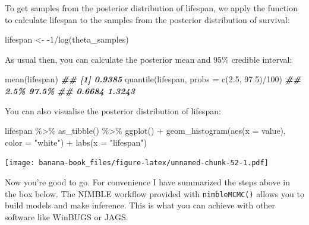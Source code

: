 \documentclass[
  12pt,
]{krantz}
\newenvironment{Shaded}{\begin{snugshade}}{\end{snugshade}}
\newcommand{\AttributeTok}[1]{\textcolor[rgb]{0.77,0.63,0.00}{#1}}
\newcommand{\DecValTok}[1]{\textcolor[rgb]{0.00,0.00,0.81}{#1}}
\newcommand{\DocumentationTok}[1]{\textcolor[rgb]{0.56,0.35,0.01}{\textbf{\textit{#1}}}}
\newcommand{\FloatTok}[1]{\textcolor[rgb]{0.00,0.00,0.81}{#1}}
\newcommand{\FunctionTok}[1]{\textcolor[rgb]{0.00,0.00,0.00}{#1}}
\newcommand{\NormalTok}[1]{#1}
\newcommand{\OtherTok}[1]{\textcolor[rgb]{0.56,0.35,0.01}{#1}}
\newcommand{\SpecialCharTok}[1]{\textcolor[rgb]{0.00,0.00,0.00}{#1}}
\newcommand{\StringTok}[1]{\textcolor[rgb]{0.31,0.60,0.02}{#1}}
\begin{document}
To get samples from the posterior distribution of lifespan, we apply the function to calculate lifespan to the samples from the posterior distribution of survival:

\begin{Shaded}
\begin{Highlighting}[]
\NormalTok{lifespan }\OtherTok{\textless{}{-}} \SpecialCharTok{{-}}\DecValTok{1}\SpecialCharTok{/}\FunctionTok{log}\NormalTok{(theta\_samples)}
\end{Highlighting}
\end{Shaded}

As usual then, you can calculate the posterior mean and 95\% credible interval:

\begin{Shaded}
\begin{Highlighting}[]
\FunctionTok{mean}\NormalTok{(lifespan)}
\DocumentationTok{\#\# [1] 0.9385}
\FunctionTok{quantile}\NormalTok{(lifespan, }\AttributeTok{probs =} \FunctionTok{c}\NormalTok{(}\FloatTok{2.5}\NormalTok{, }\FloatTok{97.5}\NormalTok{)}\SpecialCharTok{/}\DecValTok{100}\NormalTok{)}
\DocumentationTok{\#\#   2.5\%  97.5\% }
\DocumentationTok{\#\# 0.6684 1.3243}
\end{Highlighting}
\end{Shaded}

You can also visualise the posterior distribution of lifespan:

\begin{Shaded}
\begin{Highlighting}[]
\NormalTok{lifespan }\SpecialCharTok{\%\textgreater{}\%}
  \FunctionTok{as\_tibble}\NormalTok{() }\SpecialCharTok{\%\textgreater{}\%}
  \FunctionTok{ggplot}\NormalTok{() }\SpecialCharTok{+}
  \FunctionTok{geom\_histogram}\NormalTok{(}\FunctionTok{aes}\NormalTok{(}\AttributeTok{x =}\NormalTok{ value), }\AttributeTok{color =} \StringTok{"white"}\NormalTok{) }\SpecialCharTok{+}
  \FunctionTok{labs}\NormalTok{(}\AttributeTok{x =} \StringTok{"lifespan"}\NormalTok{)}
\end{Highlighting}
\end{Shaded}

\texttt{[image: banana-book\_files/figure-latex/unnamed-chunk-52-1.pdf]}

Now you're good to go. For convenience I have summarized the steps above in the box below. The NIMBLE workflow provided with \texttt{nimbleMCMC()} allows you to build models and make inference. This is what you can achieve with other software like WinBUGS or JAGS.
\end{document}
